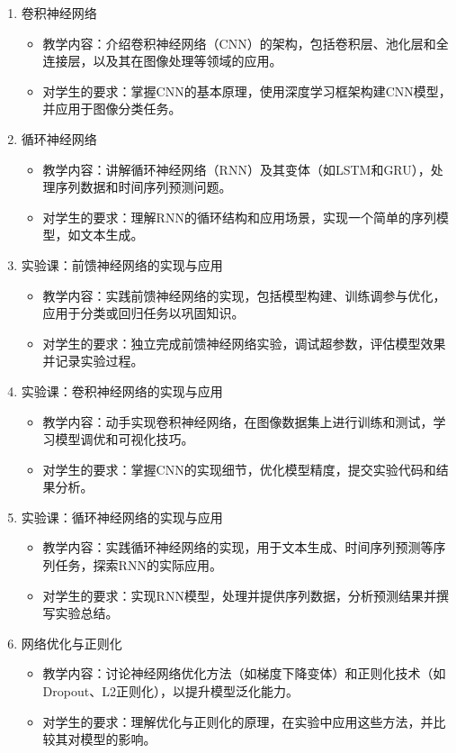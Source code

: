 \documentclass{../nndlcourse}
\begin{document}
\begin{enumerate}
\item 卷积神经网络
\begin{itemize}
    \item 教学内容：介绍卷积神经网络（CNN）的架构，包括卷积层、池化层和全连接层，以及其在图像处理等领域的应用。
    \item 对学生的要求：掌握CNN的基本原理，使用深度学习框架构建CNN模型，并应用于图像分类任务。
\end{itemize}

\item 循环神经网络
\begin{itemize}
    \item 教学内容：讲解循环神经网络（RNN）及其变体（如LSTM和GRU），处理序列数据和时间序列预测问题。
    \item 对学生的要求：理解RNN的循环结构和应用场景，实现一个简单的序列模型，如文本生成。
\end{itemize}

\item 实验课：前馈神经网络的实现与应用
\begin{itemize}
    \item 教学内容：实践前馈神经网络的实现，包括模型构建、训练调参与优化，应用于分类或回归任务以巩固知识。
    \item 对学生的要求：独立完成前馈神经网络实验，调试超参数，评估模型效果并记录实验过程。
\end{itemize}

\item 实验课：卷积神经网络的实现与应用
\begin{itemize}
    \item 教学内容：动手实现卷积神经网络，在图像数据集上进行训练和测试，学习模型调优和可视化技巧。
    \item 对学生的要求：掌握CNN的实现细节，优化模型精度，提交实验代码和结果分析。
\end{itemize}

\item 实验课：循环神经网络的实现与应用
\begin{itemize}
    \item 教学内容：实践循环神经网络的实现，用于文本生成、时间序列预测等序列任务，探索RNN的实际应用。
    \item 对学生的要求：实现RNN模型，处理并提供序列数据，分析预测结果并撰写实验总结。
\end{itemize}

\item 网络优化与正则化
\begin{itemize}
    \item 教学内容：讨论神经网络优化方法（如梯度下降变体）和正则化技术（如Dropout、L2正则化），以提升模型泛化能力。
    \item 对学生的要求：理解优化与正则化的原理，在实验中应用这些方法，并比较其对模型的影响。
\end{itemize}


\end{enumerate}
\end{document}
